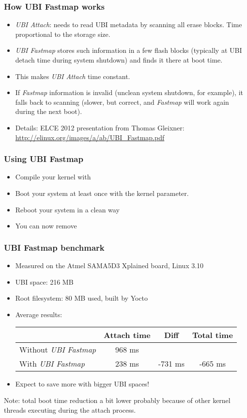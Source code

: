 \begin{frame}
\frametitle{How UBI Fastmap works}
\begin{itemize}
\item {\em UBI Attach}: needs to read UBI metadata by
      scanning all erase blocks. Time proportional
      to the storage size. 
\item {\em UBI Fastmap} stores such information in a few flash
      blocks (typically at UBI detach time during system
      shutdown) and finds it there at boot time.
\item This makes {\em UBI Attach} time constant.
\item If {\em Fastmap} information is invalid (unclean system
      shutdown, for example), it falls back to scanning
      (slower, but correct, and {\em Fastmap} will work again
      during the next boot).
\item Details: ELCE 2012 presentation from Thomas Gleixner:
      \url{http://elinux.org/images/a/ab/UBI_Fastmap.pdf}
\end{itemize}
\end{frame}

\begin{frame}
\frametitle{Using UBI Fastmap}
\begin{itemize}
\item Compile your kernel with 
\item Boot your system at least once with the
       kernel parameter.
\item Reboot your system in a clean way
\item You can now remove 
\end{itemize}
\end{frame}

\begin{frame}
\frametitle{UBI Fastmap benchmark}
\begin{itemize}
\item Measured on the Atmel SAMA5D3 Xplained board, Linux 3.10
\item UBI space: 216 MB
\item Root filesystem: 80 MB used, built by Yocto 
\item Average results:
    \newline \newline
    \begin{tabular}{| l || c | c | c |}
    \hline
    & Attach time & Diff & Total time\\
    \hline
    Without {\em UBI Fastmap} & 968 ms & & \\
    With {\em UBI Fastmap} & 238 ms & -731 ms & -665 ms \\
    \hline
    \end{tabular}
    \newline
\item Expect to save more with bigger UBI spaces!
\end{itemize}
Note: total boot time reduction a bit lower probably
because of other kernel threads executing during the
attach process.
\end{frame}

